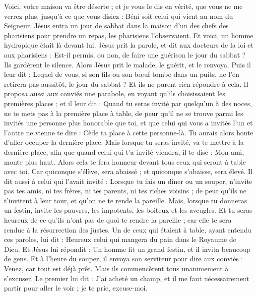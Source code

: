 \begin{multicols}{2}
Voici, votre maison va être déserte ; et je vous le dis en vérité, que vous ne me verrez plus, jusqu'à ce que vous disiez : Béni soit celui qui vient au nom du Seigneur.
\VerseOne{}Jésus entra un jour de sabbat dans la maison d'un des chefs des pharisiens pour prendre un repas, les pharisiens l'observaient.
Et voici, un homme hydropique était là devant lui.
Jésus prit la parole, et dit aux docteurs de la loi et aux pharisiens : Est-il permis, ou non, de faire une guérison le jour du sabbat ?
Ils gardèrent le silence. Alors Jésus prit le malade, le guérit, et le renvoya.
Puis il leur dit : Lequel de vous, si son fils ou son bœuf tombe dans un puits, ne l'en retirera pas aussitôt, le jour du sabbat ?
Et ils ne purent rien répondre à cela.
Il proposa aussi aux conviés une parabole, en voyant qu'ils choisissaient les premières places ; et il leur dit :
Quand tu seras invité par quelqu'un à des noces, ne te mets pas à la première place à table, de peur qu'il ne se trouve parmi les invités une personne plus honorable que toi,
et que celui qui vous a invités l'un et l'autre ne vienne te dire : Cède ta place à cette personne-là. Tu aurais alors honte d'aller occuper la dernière place.
Mais lorsque tu seras invité, va te mettre à la dernière place, afin que quand celui qui t'a invité viendra, il te dise : Mon ami, monte plus haut. Alors cela te fera honneur devant tous ceux qui seront à table avec toi.
Car quiconque s'élève, sera abaissé ; et quiconque s'abaisse, sera élevé.
Il dit aussi à celui qui l'avait invité : Lorsque tu fais un dîner ou un souper, n'invite pas tes amis, ni tes frères, ni tes parents, ni tes riches voisins ; de peur qu'ils ne t'invitent à leur tour, et qu'on ne te rende la pareille.
Mais, lorsque tu donneras un festin, invite les pauvres, les impotents, les boiteux et les aveugles.
Et tu seras heureux de ce qu'ils n'ont pas de quoi te rendre la pareille ; car elle te sera rendue à la résurrection des justes.
Un de ceux qui étaient à table, ayant entendu ces paroles, lui dit : Heureux celui qui mangera du pain dans le Royaume de Dieu.
Et Jésus lui répondit : Un homme fit un grand festin, et il invita beaucoup de gens.
Et à l'heure du souper, il envoya son serviteur pour dire aux conviés : Venez, car tout est déjà prêt.
Mais ils commencèrent tous unanimement à s'excuser. Le premier lui dit : J'ai acheté un champ, et il me faut nécessairement partir pour aller le voir ; je te prie, excuse-moi.

\end{multicols}
